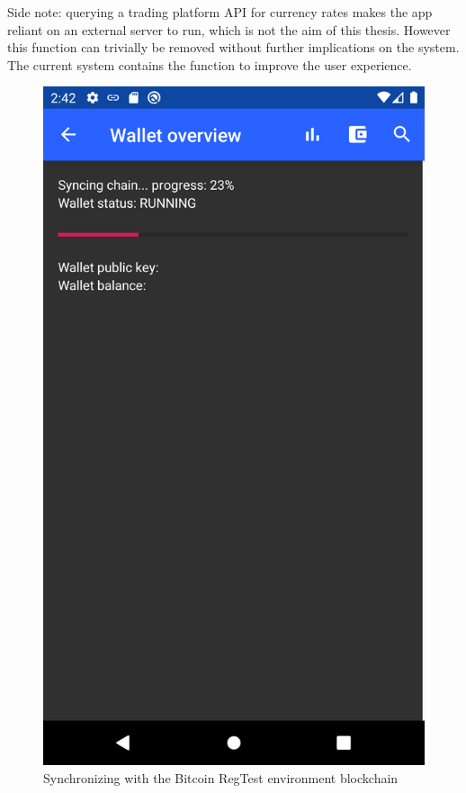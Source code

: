 Side note: querying a trading platform API for currency rates makes the app reliant on an external server to run, which is not the aim of this thesis. However this function can trivially be removed without further implications on the system. The current system contains the function to improve the user experience.
\begin{figure}
        \includegraphics[width=1\linewidth]{implementation/wallet-sync.png}
        \caption{Synchronizing with the Bitcoin RegTest environment blockchain}

\end{figure}
